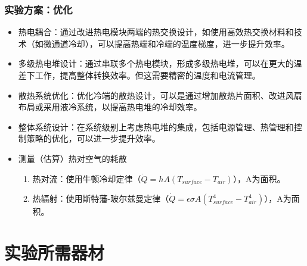\documentclass[aspectratio=169]{beamer}
\begin{document}
	\begin{frame}
		\frametitle{实验方案：优化}
		
		\begin{itemize}
			\item 热电耦合：通过改进热电模块两端的热交换设计，如使用高效热交换材料和技术（如\textcolor{c4}{微通道冷却}），可以提高热端和冷端的温度梯度，进一步提升效率。
			
			\item \textcolor{c4}{多级热电堆}设计：通过串联多个热电模块，形成多级热电堆，可以在更大的温差下工作，提高整体转换效率。但这需要精密的温度和电流管理。
			
			\item 散热系统优化：\textcolor{c4}{优化冷端的散热设计}，可以是通过增加散热片面积、改进风扇布局或采用液冷系统，以提高热电堆的冷却效率。
			
			\item 整体系统设计：\textcolor{c4}{在系统级别上考虑热电堆的集成}，包括电源管理、热管理和控制策略的优化，可以进一步提升效率。
			
			\item 测量（估算）热对空气的耗散
			\begin{enumerate}
				\item 热对流：使用牛顿冷却定律（$\dot{Q}=hA(T_{surface}-T_{air})$），A为面积。
				\item 热辐射：使用斯特藩-玻尔兹曼定律（$\dot{Q}=\epsilon\sigma A(T^4_{surface}-T^4_{air})$），A为面积。				
			\end{enumerate}
		\end{itemize}
		
	\end{frame}
	
	
	\section{实验所需器材}
	
	
\end{document}
